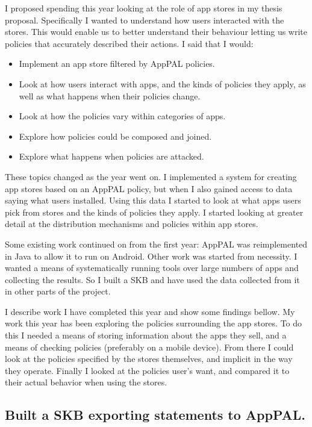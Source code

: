 \documentclass[a4paper]{scrartcl}
\begin{document}
I proposed spending this year looking at the role of app stores in my thesis proposal.
Specifically I wanted to understand how users interacted with the stores.
This would enable us to better understand their behaviour letting us write policies that accurately described their actions.
I said that I would:
\begin{itemize}
  \item Implement an app store filtered by AppPAL policies.
  \item Look at how users interact with apps, and the kinds of policies they apply, as well as what happens when their policies change.
  \item Look at how the policies vary within categories of apps.
  \item Explore how policies could be composed and joined.
  \item Explore what happens when policies are attacked.
\end{itemize}

These topics changed as the year went on.
I implemented a system for creating app stores based on an AppPAL policy, but when I also gained access to data saying what users installed.
Using this data I started to look at what apps users pick from stores and the kinds of policies they apply.
I started looking at greater detail at the distribution mechanisms and policies within app stores.

Some existing work continued on from the first year: AppPAL was reimplemented in Java to allow it to run on Android.
Other work was started from necessity.
I wanted a means of systematically running tools over large numbers of apps and collecting the results.
So I built a \ac{SKB}  and have used the data collected from it in other parts of the project.

I describe work I have completed this year and show some findings bellow.
My work this year has been exploring the policies surrounding the app stores.
To do this I needed a means of storing information about the apps they sell, and a means of checking policies (preferably on a mobile device).
From there I could look at the policies specified by the stores themselves, and implicit in the way they operate.
Finally I looked at the policies user's want, and compared it to their actual behavior when using the stores.

\subsection{Built a \ac{SKB} exporting statements to AppPAL.}
\end{document}
